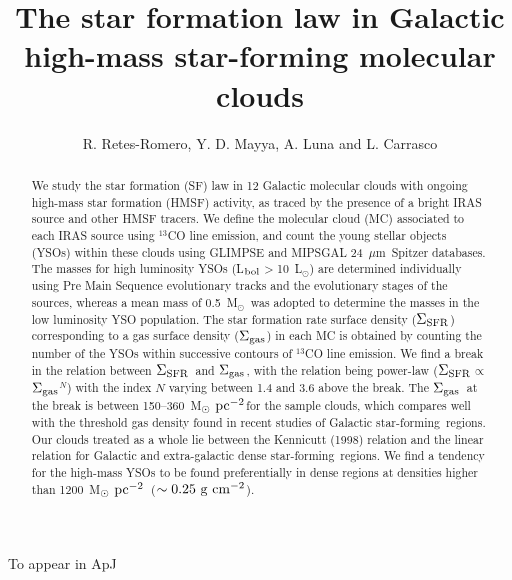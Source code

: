 \documentclass[iop]{emulateapj}
\date{}
\newcommand{\msun}{M$_{\odot}$}
\newcommand{\lsun}{L$_{\odot}$}
\newcommand{\lbol}{L$_{\rm bol}$}
\newcommand{\starf}{star-forming}
\newcommand{\msunpc}{M$_{\odot}~{\rm pc}^{-2}$}
\newcommand{\mipslam}{24~$\mu$m}
\newcommand{\sigsfr}{$\Sigma_{\rm SFR}$}
\newcommand{\siggas}{$\Sigma_{\rm gas}$}
\begin{document}
\title{The star formation law in Galactic high-mass star-forming molecular clouds}


\author{R. Retes-Romero, Y. D. Mayya, A. Luna and L. Carrasco}
To appear in ApJ

\begin{abstract}
We study the star formation (SF) law in 12 Galactic 
molecular clouds with ongoing high-mass star formation (HMSF) activity, as 
traced by the presence of a bright IRAS source and other HMSF tracers. 
We define the molecular cloud (MC) associated to each IRAS source using 
$^{13}$CO line emission, and count the young stellar objects (YSOs) within 
these clouds using GLIMPSE and MIPSGAL \mipslam\ Spitzer databases.
The masses for high luminosity YSOs (\lbol$>$10~\lsun) are determined 
individually using Pre Main Sequence evolutionary tracks and the evolutionary 
stages of the sources, whereas a mean mass of 0.5~\msun\ was adopted to
determine the masses in the low luminosity YSO population. The star formation 
rate surface density (\sigsfr) corresponding to a gas surface density (\siggas) 
in each MC
is obtained by counting the number of the YSOs within successive contours 
of $^{13}$CO line emission. We find a break in the relation between \sigsfr\ 
and \siggas, with the relation being power-law (\sigsfr$\propto$\siggas$^N$) 
with the index $N$ varying between 1.4 and 3.6 above the break. The \siggas\ 
at the break is between 150--360~\msunpc for the sample clouds, which 
compares well with the threshold gas density found in recent studies of 
Galactic \starf~regions. 
Our clouds treated as a whole lie between the
Kennicutt (1998) relation and the linear relation for Galactic and 
extra-galactic dense \starf~regions. 
We find a tendency for the high-mass YSOs to be found preferentially in dense 
regions at densities higher than 1200~\msunpc\ ($\rm \sim0.25~g~cm^{-2}$).
\end{abstract}
\end{document}

